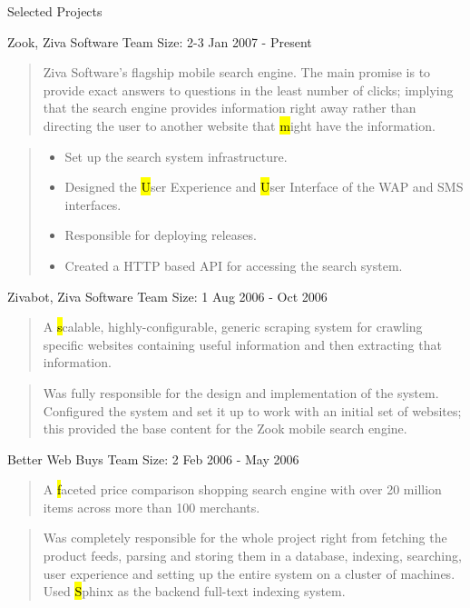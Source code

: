 \documentclass{resume}
\newcommand{\teamsize}{\hfill\sc\footnotesize Team Size: }
\begin{document}
\begin{category}{Selected Projects}{}
    \pagebreak

    \item {\topic Zook,} Ziva Software
        {\teamsize 2-3}
        {\period Jan 2007 - Present}
        \begin{quote}
            Ziva Software's flagship mobile search engine. The main promise is
            to provide exact answers to questions in the least number of
            clicks; implying that the search engine provides information right
            away rather than directing the user to another website that {\hl
            might} have the information.
        \end{quote}
        \begin{quote}
            \begin{itemize}
                \item Set up the search system infrastructure.
                \item Designed the {\hl User Experience} and {\hl User
                    Interface} of the WAP and SMS interfaces.
                \item Responsible for deploying releases.
                \item Created a HTTP based API for accessing the search system.
            \end{itemize}
        \end{quote}

    \item {\topic Zivabot,} Ziva Software
        {\teamsize 1}
        {\period Aug 2006 - Oct 2006}
        \begin{quote}
            A {\hl scalable, highly-configurable, generic scraping system} for
            crawling specific websites containing useful information and then
            extracting that information.
        \end{quote}
        \begin{quote}
            Was fully responsible for the design and implementation of the
            system. Configured the system and set it up to work with an initial
            set of websites; this provided the base content for the Zook mobile
            search engine.
        \end{quote}

    \item {\topic Better Web Buys}
        {\teamsize 2}
        {\period Feb 2006 - May 2006}
        \begin{quote}
            A {\hl faceted price comparison shopping search engine} with over
            20 million items across more than 100 merchants.
        \end{quote}
        \begin{quote}
            Was completely responsible for the whole project right from
            fetching the product feeds, parsing and storing them in a database,
            indexing, searching, user experience and setting up the entire
            system on a cluster of machines. Used {\hl Sphinx} as the backend
            full-text indexing system.
        \end{quote}


\end{category}
\end{document}
